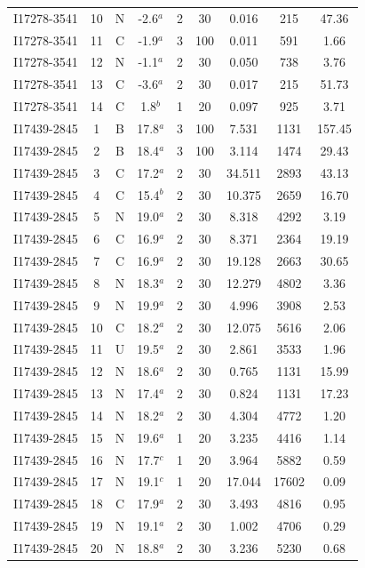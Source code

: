 \begin{table}
\begin{tabular}{ccccccccc}
I17278-3541 & 10 & N & -2.6$^{a}$ & 2 & 30 & 0.016 & 215 & 47.36 \\
I17278-3541 & 11 & C & -1.9$^{a}$ & 3 & 100 & 0.011 & 591 & 1.66 \\
I17278-3541 & 12 & N & -1.1$^{a}$ & 2 & 30 & 0.050 & 738 & 3.76 \\
I17278-3541 & 13 & C & -3.6$^{a}$ & 2 & 30 & 0.017 & 215 & 51.73 \\
I17278-3541 & 14 & C & 1.8$^{b}$ & 1 & 20 & 0.097 & 925 & 3.71 \\
I17439-2845 & 1 & B & 17.8$^{a}$ & 3 & 100 & 7.531 & 1131 & 157.45 \\
I17439-2845 & 2 & B & 18.4$^{a}$ & 3 & 100 & 3.114 & 1474 & 29.43 \\
I17439-2845 & 3 & C & 17.2$^{a}$ & 2 & 30 & 34.511 & 2893 & 43.13 \\
I17439-2845 & 4 & C & 15.4$^{b}$ & 2 & 30 & 10.375 & 2659 & 16.70 \\
I17439-2845 & 5 & N & 19.0$^{a}$ & 2 & 30 & 8.318 & 4292 & 3.19 \\
I17439-2845 & 6 & C & 16.9$^{a}$ & 2 & 30 & 8.371 & 2364 & 19.19 \\
I17439-2845 & 7 & C & 16.9$^{a}$ & 2 & 30 & 19.128 & 2663 & 30.65 \\
I17439-2845 & 8 & N & 18.3$^{a}$ & 2 & 30 & 12.279 & 4802 & 3.36 \\
I17439-2845 & 9 & N & 19.9$^{a}$ & 2 & 30 & 4.996 & 3908 & 2.53 \\
I17439-2845 & 10 & C & 18.2$^{a}$ & 2 & 30 & 12.075 & 5616 & 2.06 \\
I17439-2845 & 11 & U & 19.5$^{a}$ & 2 & 30 & 2.861 & 3533 & 1.96 \\
I17439-2845 & 12 & N & 18.6$^{a}$ & 2 & 30 & 0.765 & 1131 & 15.99 \\
I17439-2845 & 13 & N & 17.4$^{a}$ & 2 & 30 & 0.824 & 1131 & 17.23 \\
I17439-2845 & 14 & N & 18.2$^{a}$ & 2 & 30 & 4.304 & 4772 & 1.20 \\
I17439-2845 & 15 & N & 19.6$^{a}$ & 1 & 20 & 3.235 & 4416 & 1.14 \\
I17439-2845 & 16 & N & 17.7$^{c}$ & 1 & 20 & 3.964 & 5882 & 0.59 \\
I17439-2845 & 17 & N & 19.1$^{c}$ & 1 & 20 & 17.044 & 17602 & 0.09 \\
I17439-2845 & 18 & C & 17.9$^{a}$ & 2 & 30 & 3.493 & 4816 & 0.95 \\
I17439-2845 & 19 & N & 19.1$^{a}$ & 2 & 30 & 1.002 & 4706 & 0.29 \\
I17439-2845 & 20 & N & 18.8$^{a}$ & 2 & 30 & 3.236 & 5230 & 0.68 \\

\end{tabular}
\end{table}
